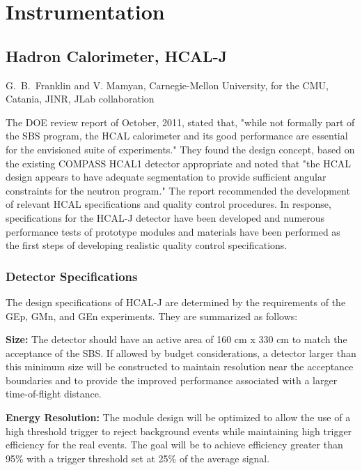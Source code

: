 \documentclass[11pt]{article}
\begin{document}
\section{Instrumentation}

\subsection{Hadron Calorimeter, HCAL-J}
\label{sec:HCAL}

\begin{center} 
G.~B.~Franklin and V. Mamyan, Carnegie-Mellon University, for the CMU, Catania, JINR, JLab collaboration
\end{center}

The DOE review report of October, 2011, stated that, "while not formally part of the SBS program, the HCAL calorimeter and its good
performance are essential for the envisioned suite of experiments."  They found the design concept,
based on the existing COMPASS HCAL1 detector appropriate and noted that "the HCAL design appears to have
adequate segmentation to provide sufficient angular constraints for the neutron program."  The report recommended  the development of relevant HCAL specifications and quality control procedures.  In response, specifications for the HCAL-J detector have been developed and numerous performance tests of prototype modules and materials have been performed as the first steps of developing realistic quality control specifications.   

\subsubsection{Detector Specifications}
\label{sec:Detector}

The design specifications of HCAL-J are determined by the requirements of the GEp, GMn, and GEn experiments.  
They are summarized as follows:

{\bf Size:}
The detector should have an active area of 160 cm x 330 cm to match the acceptance of the SBS.
If allowed by budget considerations, a detector larger than this minimum size will be constructed 
to maintain resolution near the acceptance boundaries and to provide the improved performance 
associated with a larger time-of-flight distance. 


{\bf Energy Resolution:}
The module design will be optimized to allow the use of a high threshold trigger to reject background 
events while maintaining high trigger efficiency for the real events.   The goal will be to achieve 
efficiency greater than 95\% with a trigger threshold set at 25\% of the average signal.
\end{document}
